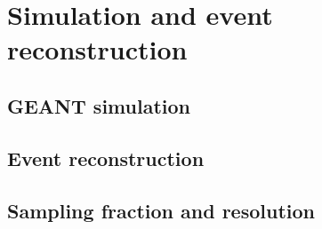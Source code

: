 \section{Simulation and event reconstruction}

\subsection{GEANT simulation}
\subsection{Event reconstruction}
\subsection{Sampling fraction and resolution}




